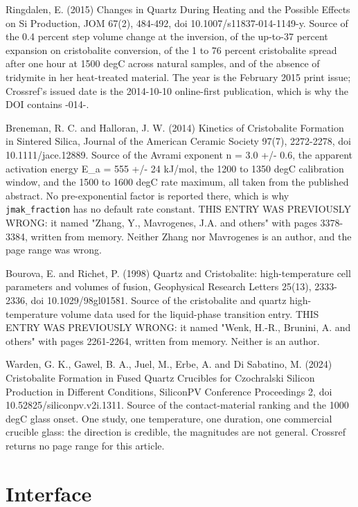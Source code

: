 \documentclass[10pt,a4paper,twoside]{report}
\begin{document}
Ringdalen, E. (2015) Changes in Quartz During Heating and the Possible Effects on Si Production, JOM 67(2), 484-492, doi 10.1007/s11837-014-1149-y. Source of the 0.4 percent step volume change at the inversion, of the up-to-37 percent expansion on cristobalite conversion, of the 1 to 76 percent cristobalite spread after one hour at 1500 degC across natural samples, and of the absence of tridymite in her heat-treated material. The year is the February 2015 print issue; Crossref's issued date is the 2014-10-10 online-first publication, which is why the DOI contains -014-.

Breneman, R. C. and Halloran, J. W. (2014) Kinetics of Cristobalite Formation in Sintered Silica, Journal of the American Ceramic Society 97(7), 2272-2278, doi 10.1111/jace.12889. Source of the Avrami exponent n = 3.0 +/- 0.6, the apparent activation energy E\_a = 555 +/- 24 kJ/mol, the 1200 to 1350 degC calibration window, and the 1500 to 1600 degC rate maximum, all taken from the published abstract. No pre-exponential factor is reported there, which is why \texttt{jmak\_fraction} has no default rate constant. THIS ENTRY WAS PREVIOUSLY WRONG: it named "Zhang, Y., Mavrogenes, J.A. and others" with pages 3378-3384, written from memory. Neither Zhang nor Mavrogenes is an author, and the page range was wrong.

Bourova, E. and Richet, P. (1998) Quartz and Cristobalite: high-temperature cell parameters and volumes of fusion, Geophysical Research Letters 25(13), 2333-2336, doi 10.1029/98gl01581. Source of the cristobalite and quartz high-temperature volume data used for the liquid-phase transition entry. THIS ENTRY WAS PREVIOUSLY WRONG: it named "Wenk, H.-R., Brunini, A. and others" with pages 2261-2264, written from memory. Neither is an author.

Warden, G. K., Gawel, B. A., Juel, M., Erbe, A. and Di Sabatino, M. (2024) Cristobalite Formation in Fused Quartz Crucibles for Czochralski Silicon Production in Different Conditions, SiliconPV Conference Proceedings 2, doi 10.52825/siliconpv.v2i.1311. Source of the contact-material ranking and the 1000 degC glass onset. One study, one temperature, one duration, one commercial crucible glass: the direction is credible, the magnitudes are not general. Crossref returns no page range for this article.

\section{Interface}
\end{document}
